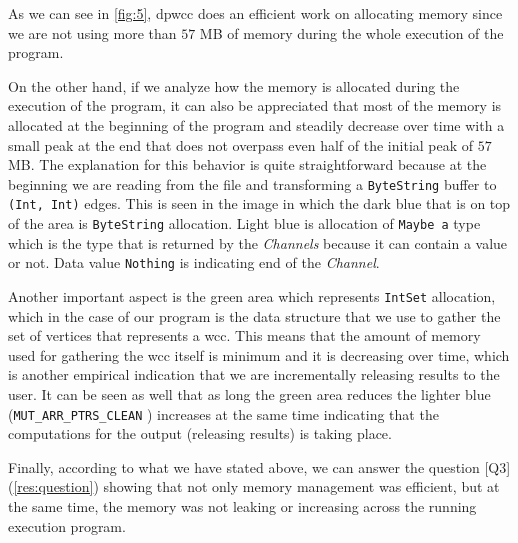 
As we can see in \autoref{fig:5}, \acrshort{dpwcc} does an efficient work on allocating memory since we are not using more than $57$ MB of memory during the whole execution of the program.

On the other hand, if we analyze how the memory is allocated during the execution of the program, it can also be appreciated that most of the memory is allocated at the beginning of the program and steadily decrease over time with a small peak at the end that does not overpass even half of the initial peak of $57$ MB. The explanation for this behavior is quite straightforward because at the beginning we are reading from the file and transforming a \texttt{ByteString} buffer to \texttt{(Int, Int)} edges. This is seen in the image in which the dark blue that is on top of the area is \texttt{ByteString} allocation. Light blue is allocation of \texttt{Maybe a} type which is the type that is returned by the \textit{Channels} because it can contain a value or not. Data value \texttt{Nothing} is indicating end of the \textit{Channel}. 

Another important aspect is the green area which represents \texttt{IntSet} allocation, which in the case of our program is the data structure that we use to gather the set of vertices that represents a \acrshort{wcc}. This means that the amount of memory used for gathering the \acrshort{wcc} itself is minimum and it is decreasing over time, which is another empirical indication that we are incrementally releasing results to the user. It can be seen as well that as long the green area reduces the lighter blue (\texttt{MUT_ARR_PTRS_CLEAN} \cite{ghcheap}) increases at the same time indicating that the computations for the output (releasing results) is taking place. 

Finally, according to what we have stated above, we can answer the question [Q3] (\autoref{res:question}) showing that not only memory management was efficient, but at the same time, the memory was not leaking or increasing across the running execution program.
\fi